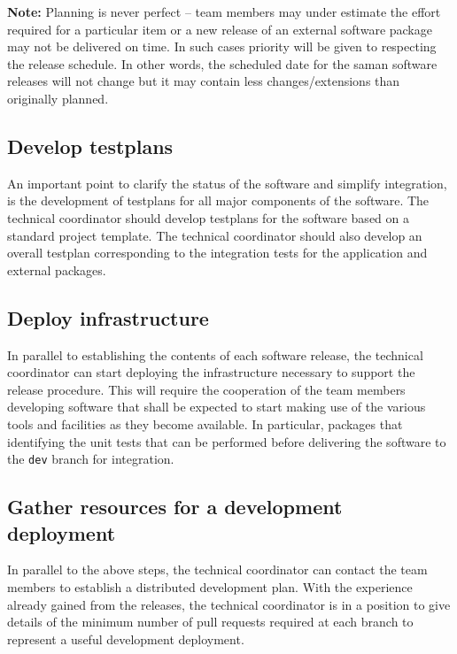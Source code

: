 \noindent \textbf{Note:} Planning is never perfect – team members may under estimate the effort required for a particular item or a new release of an external software package may not be delivered on time. In such cases priority will be given to respecting the release schedule. In other words, the scheduled date for the saman software releases will not change but it may contain less changes/extensions than originally planned.

\subsection{Develop testplans}

\noindent An important point to clarify the status of the software and simplify integration, is the development of testplans for all major components of the software. The technical coordinator should develop testplans for the software based on a standard project template. The technical coordinator should also develop an overall testplan corresponding to the integration tests for the application and external packages.

\subsection{Deploy infrastructure}

\noindent In parallel to establishing the contents of each software release, the technical coordinator can start deploying the infrastructure necessary to support the release procedure. This will require the cooperation of the team members developing software that shall be expected to start making use of the various tools and facilities as they become available. In particular, packages that identifying the unit tests that can be performed before delivering the software to the \texttt{dev} branch for integration.

\subsection{Gather resources for a development deployment}

\noindent In parallel to the above steps, the technical coordinator can contact the team members to establish a distributed development plan. With the experience already gained from the releases, the technical coordinator is in a position to give details of the minimum number of pull requests required at each branch to represent a useful development deployment. 